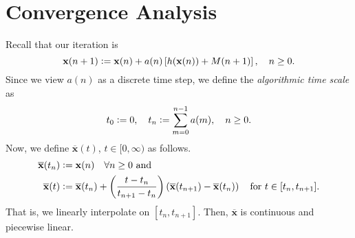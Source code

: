 \section{Convergence Analysis}

Recall that our iteration is
\[
    \mathbf{x}(n+1) \vcentcolon= \mathbf{x}(n) + a(n) \left[ h(\mathbf{x}(n)) + M(n+1) \right], \quad n \geq 0.
\]
Since we view $a(n)$ as a discrete time step, we define the \emph{algorithmic time scale} as
\[
    t_0 \vcentcolon= 0, \quad t_n \vcentcolon= \sum_{m=0}^{n-1} a(m), \quad n \geq 0.
\]
Now, we define $\overline{\mathbf{x}}(t)$, $t \in [0,\infty)$ as follows. 
\begin{align*}
    \overline{\mathbf{x}}(t_n) &\vcentcolon= \mathbf{x}(n) \quad \forall n \geq 0 \text{ and} \\
    \overline{\mathbf{x}}(t) &\vcentcolon= \overline{\mathbf{x}}(t_n) + \left( \frac{t - t_n}{t_{n+1} - t_n} \right) \left( \overline{\mathbf{x}}(t_{n+1}) - \overline{\mathbf{x}}(t_n) \right) \quad \text{for } t \in [t_n, t_{n+1}].
\end{align*}
That is, we linearly interpolate on $[t_n, t_{n+1}]$. Then, $\overline{\mathbf{x}}$ is continuous and piecewise linear. 